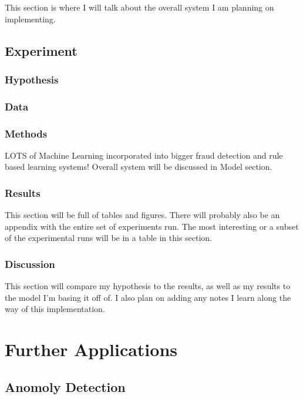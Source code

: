 \documentclass[midd]{thesis}
\begin{document}
This section is where I will talk about the overall system I am planning on implementing.

\pagebreak

\section{Experiment}
\pagebreak

\subsection{Hypothesis}
\pagebreak

\subsection{Data}
\pagebreak

\subsection{Methods}

LOTS of Machine Learning incorporated into bigger fraud detection and rule based learning systems! Overall system will be discussed in Model section.
\pagebreak

\subsection{Results}

This section will be full of tables and figures. There will probably also be an appendix with the entire set of experiments run. The most interesting or a subset of the experimental runs will be in a table in this section.
\pagebreak

\subsection{Discussion}

This section will compare my hypothesis to the results, as well as my results to the model I'm basing it off of. I also plan on adding any notes I learn along the way of this implementation.
\pagebreak


\chapter{Further Applications}
\pagebreak

\section{Anomoly Detection}
\pagebreak
\end{document}

